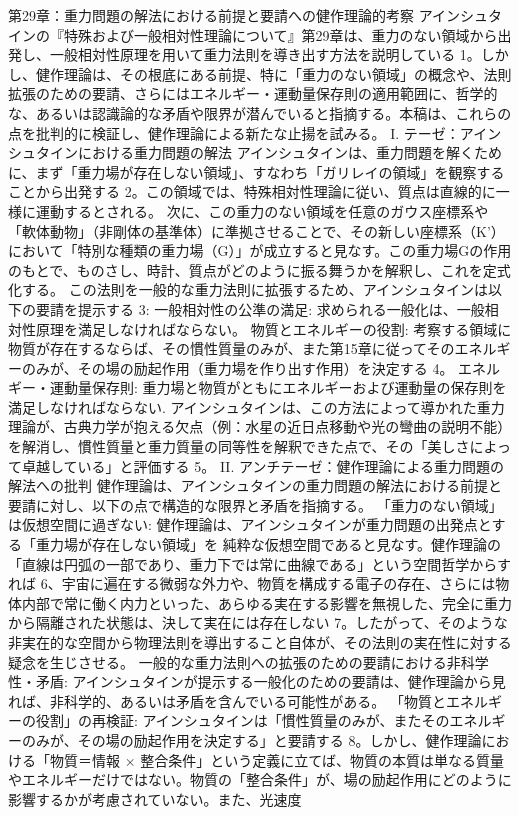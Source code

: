 \documentclass{article}
\begin{document}
第29章：重力問題の解法における前提と要請への健作理論的考察
アインシュタインの『特殊および一般相対性理論について』第29章は、重力のない領域から出発し、一般相対性原理を用いて重力法則を導き出す方法を説明している 1。しかし、健作理論は、その根底にある前提、特に「重力のない領域」の概念や、法則拡張のための要請、さらにはエネルギー・運動量保存則の適用範囲に、哲学的な、あるいは認識論的な矛盾や限界が潜んでいると指摘する。本稿は、これらの点を批判的に検証し、健作理論による新たな止揚を試みる。
I. テーゼ：アインシュタインにおける重力問題の解法
アインシュタインは、重力問題を解くために、まず「重力場が存在しない領域」、すなわち「ガリレイの領域」を観察することから出発する 2。この領域では、特殊相対性理論に従い、質点は直線的に一様に運動するとされる。
次に、この重力のない領域を任意のガウス座標系や「軟体動物」（非剛体の基準体）に準拠させることで、その新しい座標系（K'）において「特別な種類の重力場（G）」が成立すると見なす。この重力場Gの作用のもとで、ものさし、時計、質点がどのように振る舞うかを解釈し、これを定式化する。
この法則を一般的な重力法則に拡張するため、アインシュタインは以下の要請を提示する 3:
一般相対性の公準の満足: 求められる一般化は、一般相対性原理を満足しなければならない。
物質とエネルギーの役割: 考察する領域に物質が存在するならば、その慣性質量のみが、また第15章に従ってそのエネルギーのみが、その場の励起作用（重力場を作り出す作用）を決定する 4。
エネルギー・運動量保存則: 重力場と物質がともにエネルギーおよび運動量の保存則を満足しなければならない.
アインシュタインは、この方法によって導かれた重力理論が、古典力学が抱える欠点（例：水星の近日点移動や光の彎曲の説明不能）を解消し、慣性質量と重力質量の同等性を解釈できた点で、その「美しさによって卓越している」と評価する 5。
II. アンチテーゼ：健作理論による重力問題の解法への批判
健作理論は、アインシュタインの重力問題の解法における前提と要請に対し、以下の点で構造的な限界と矛盾を指摘する。
「重力のない領域」は仮想空間に過ぎない:
健作理論は、アインシュタインが重力問題の出発点とする「重力場が存在しない領域」を
純粋な仮想空間であると見なす。健作理論の「直線は円弧の一部であり、重力下では常に曲線である」という空間哲学からすれば 6、宇宙に遍在する微弱な外力や、物質を構成する電子の存在、さらには物体内部で常に働く内力といった、あらゆる実在する影響を無視した、完全に重力から隔離された状態は、決して実在には存在しない 7。したがって、そのような非実在的な空間から物理法則を導出すること自体が、その法則の実在性に対する疑念を生じさせる。
一般的な重力法則への拡張のための要請における非科学性・矛盾:
アインシュタインが提示する一般化のための要請は、健作理論から見れば、非科学的、あるいは矛盾を含んでいる可能性がある。
「物質とエネルギーの役割」の再検証: アインシュタインは「慣性質量のみが、またそのエネルギーのみが、その場の励起作用を決定する」と要請する 8。しかし、健作理論における「物質＝情報 × 整合条件」という定義に立てば、物質の本質は単なる質量やエネルギーだけではない。物質の「整合条件」が、場の励起作用にどのように影響するかが考慮されていない。また、光速度 
\end{document}

